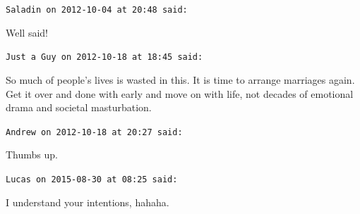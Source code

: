 \begin{footnotesize}
\begin{sffamily}
\hfill

\texttt{Saladin on 2012-10-04 at 20:48 said: }

Well said!


\hfill

\texttt{Just a Guy on 2012-10-18 at 18:45 said: }

So much of people's lives is wasted in this. It is time to arrange marriages again. Get it over and done with early and move on with life, not decades of emotional drama and societal masturbation.


\hfill

\texttt{Andrew on 2012-10-18 at 20:27 said: }

Thumbs up.


\hfill

\texttt{Lucas on 2015-08-30 at 08:25 said: }

I understand your intentions, hahaha.


\hfill


\end{sffamily}\end{footnotesize}
